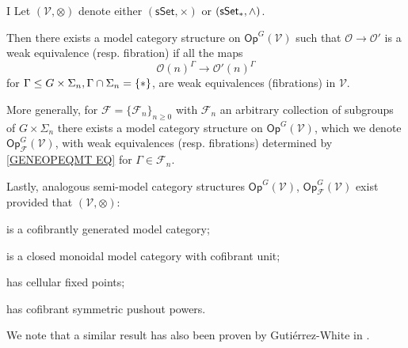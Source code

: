 \documentclass[a4paper,10pt
,draft
]{article}%
\numberwithin{equation}{section}
\numberwithin{figure}{section}
\theoremstyle{definition} %
\renewcommand{\O}{\ensuremath{\mathcal O}}
\newcommand{\1}{\ensuremath{\mathbbm 1}}%
\begin{document}
\begin{customthm}{I}\label{MAINEXIST1 THM}
Let $(\mathcal{V},\otimes)$
denote either 
$(\mathsf{sSet}, \times)$
or
$(\mathsf{sSet}_{\**}, \wedge)$.

Then there exists a model category structure on 
$\mathsf{Op}^G(\mathcal{V})$ such that 
$\O \to \O'$ is a weak equivalence (resp. fibration)
if all the maps
\begin{equation}\label{GENEOPEQMT EQ}
	\O(n)^{\Gamma} \to \O'(n)^{\Gamma}
\end{equation}
for 
$\Gamma \leq G\times \Sigma_n, \Gamma \cap \Sigma_n = \{\**\}$, 
are weak equivalences (fibrations) in $\mathcal{V}$.

More generally, for $\mathcal{F} = \{\mathcal{F}_n\}_{n \geq 0}$ with $\mathcal{F}_n$ an arbitrary collection of subgroups of $G \times \Sigma_n$ there exists a model category structure on 
$\mathsf{Op}^G(\mathcal{V})$,
which we denote
$\mathsf{Op}^G_{\mathcal{F}}(\mathcal{V})$,
with weak equivalences (resp. fibrations)
determined by \eqref{GENEOPEQMT EQ} for $\Gamma \in \mathcal{F}_n$.

Lastly, 
analogous 
semi-model category structures
$\mathsf{Op}^G(\mathcal{V})$,
$\mathsf{Op}^G_{\mathcal{F}}(\mathcal{V})$
exist
provided that
$(\mathcal{V},\otimes)$:
\begin{inparaenum}
\item[(i)] is a cofibrantly generated model category;
\item [(ii)] is a closed monoidal model category with cofibrant unit;
\item[(iii)] has cellular fixed points;
\item[(iv)] has cofibrant symmetric pushout powers.
\end{inparaenum}
\end{customthm}

We note that a similar result has also been proven by Guti\'{e}rrez-White in \cite{GW18}.
\end{document}
